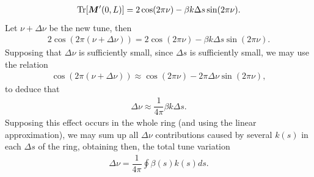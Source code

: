 \documentclass[../sands-adaptation.tex]{subfiles}
\begin{document}
\begin{align}
	\operatorname{Tr}[\boldsymbol{M}'(0,L)] = 2\cos(2\pi\nu) - \beta k \Delta s \sin(2\pi\nu).
\end{align}
Let $\nu + \Delta\nu$ be the new tune, then
\begin{align}
	2\cos(2\pi(\nu+\Delta\nu)) = 2\cos(2\pi\nu) - \beta k \Delta s \sin(2\pi\nu).
\end{align}
Supposing that $\Delta\nu$ is sufficiently small, since $\Delta s$ is sufficiently small, we may use the relation
\begin{align*}
	\cos(2\pi(\nu+\Delta\nu)) \approx \cos(2\pi\nu) - 2\pi\Delta\nu\sin(2\pi\nu),
\end{align*}
to deduce that
\begin{align}
	\Delta\nu \approx \dfrac{1}{4\pi}\beta k \Delta s.
\end{align}
Supposing this effect occurs in the whole ring (and using the linear approximation), we may sum up all $\Delta\nu$ contributions caused by several $k(s)$ in each $\Delta s$ of the ring, obtaining then, the total tune variation
\begin{align}
	\Delta\nu = \dfrac{1}{4\pi}\oint \beta(s) k(s) ds.
\end{align}
\end{document}
